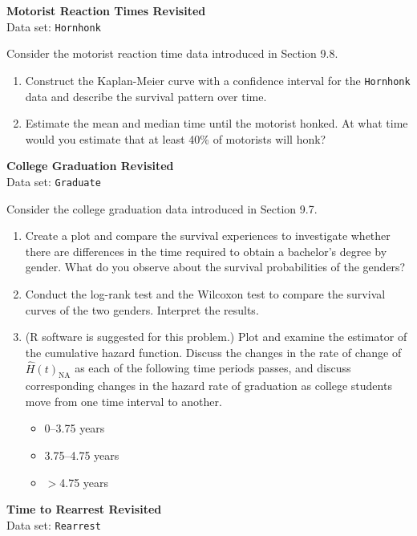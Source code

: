\documentclass[
]{report}
\begin{document}
\begin{list}{E.}{ \setlength{\itemsep}{1.2em}}
\begin{enumerate}
  \end{enumerate}

  \item \textbf{Motorist Reaction Times Revisited}\\
  Data set: \texttt{Hornhonk}

Consider the motorist reaction time data introduced in Section 9.8.
  \begin{enumerate}
    \item Construct the Kaplan-Meier curve with a confidence interval for the \texttt{Hornhonk} data and describe the survival pattern over time.
    \item Estimate the mean and median time until the motorist honked. At what time would you estimate that at least 40\% of motorists will honk?
  \end{enumerate}

  \item \textbf{College Graduation Revisited}\\
  Data set: \texttt{Graduate}

Consider the college graduation data introduced in Section 9.7.
  \begin{enumerate}
    \item Create a plot and compare the survival experiences to investigate whether there are differences in the time required to obtain a bachelor’s degree by gender. What do you observe about the survival probabilities of the genders?
    \item Conduct the log-rank test and the Wilcoxon test to compare the survival curves of the two genders. Interpret the results.
    \item (R software is suggested for this problem.) Plot and examine the estimator of the cumulative hazard function. Discuss the changes in the rate of change of $\widehat{H}(t)_{\mathrm{NA}}$ as each of the following time periods passes, and discuss corresponding changes in the hazard rate of graduation as college students move from one time interval to another.
      \begin{itemize}
        \item 0–3.75 years
        \item 3.75–4.75 years
        \item $>$4.75 years
      \end{itemize}
  \end{enumerate}

  \item \textbf{Time to Rearrest Revisited}\\
  Data set: \texttt{Rearrest}


\end{list}
\end{document}
